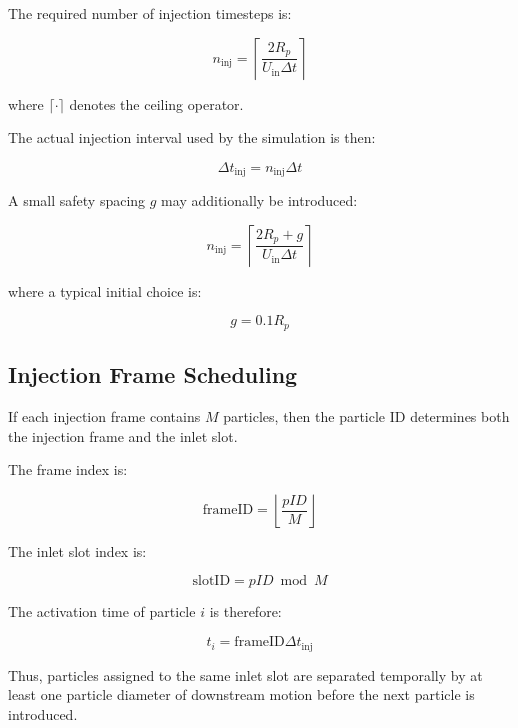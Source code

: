 \documentclass[11pt]{article}
\begin{document}
The required number of injection timesteps is:

\begin{equation}
n_{\mathrm{inj}}
=
\left\lceil
\frac{2R_p}
     {U_{\mathrm{in}}\Delta t}
\right\rceil
\end{equation}

where $\lceil \cdot \rceil$ denotes the ceiling operator.

The actual injection interval used by the simulation is then:

\begin{equation}
\Delta t_{\mathrm{inj}}
=
n_{\mathrm{inj}}\Delta t
\end{equation}

A small safety spacing $g$ may additionally be introduced:

\begin{equation}
n_{\mathrm{inj}}
=
\left\lceil
\frac{2R_p + g}
     {U_{\mathrm{in}}\Delta t}
\right\rceil
\end{equation}

where a typical initial choice is:

\begin{equation}
g = 0.1R_p
\end{equation}

\subsection{Injection Frame Scheduling}

If each injection frame contains $M$ particles, then the particle ID determines both the injection frame and the inlet slot.

The frame index is:

\begin{equation}
\mathrm{frameID}
=
\left\lfloor
\frac{pID}{M}
\right\rfloor
\end{equation}

The inlet slot index is:

\begin{equation}
\mathrm{slotID}
=
pID \bmod M
\end{equation}

The activation time of particle $i$ is therefore:

\begin{equation}
t_i
=
\mathrm{frameID}
\Delta t_{\mathrm{inj}}
\end{equation}

Thus, particles assigned to the same inlet slot are separated temporally by at least one particle diameter of downstream motion before the next particle is introduced.
\end{document}
